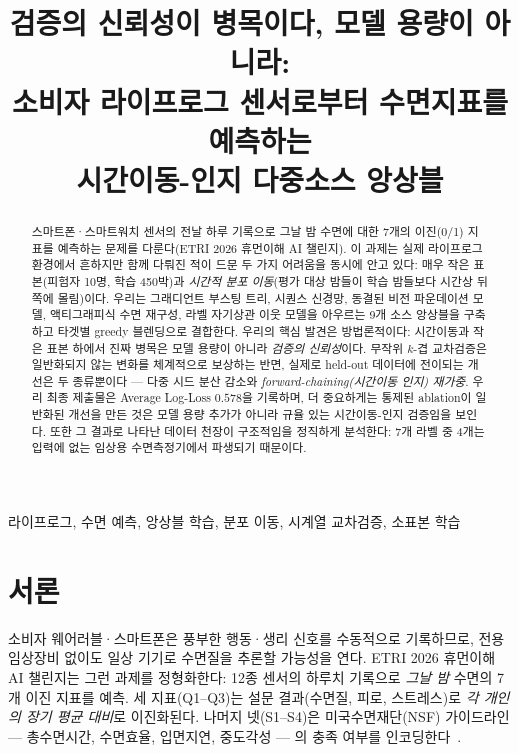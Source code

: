 \documentclass[conference]{IEEEtran}
\begin{document}
\title{검증의 신뢰성이 병목이다, 모델 용량이 아니라:\\
소비자 라이프로그 센서로부터 수면지표를 예측하는\\
시간이동-인지 다중소스 앙상블}

\author{
}

\maketitle

\begin{abstract}
스마트폰·스마트워치 센서의 전날 하루 기록으로 그날 밤 수면에 대한 7개의 이진(0/1) 지표를 예측하는
문제를 다룬다(ETRI 2026 휴먼이해 AI 챌린지). 이 과제는 실제 라이프로그 환경에서 흔하지만 함께 다뤄진
적이 드문 두 가지 어려움을 동시에 안고 있다: 매우 작은 표본(피험자 10명, 학습 450박)과 \emph{시간적
분포 이동}(평가 대상 밤들이 학습 밤들보다 시간상 뒤쪽에 몰림)이다. 우리는 그래디언트 부스팅 트리,
시퀀스 신경망, 동결된 비전 파운데이션 모델, 액티그래피식 수면 재구성, 라벨 자기상관 이웃 모델을 아우르는
9개 소스 앙상블을 구축하고 타겟별 greedy 블렌딩으로 결합한다. 우리의 핵심 발견은 방법론적이다:
시간이동과 작은 표본 하에서 진짜 병목은 모델 용량이 아니라 \emph{검증의 신뢰성}이다. 무작위 $k$-겹
교차검증은 일반화되지 않는 변화를 체계적으로 보상하는 반면, 실제로 held-out 데이터에 전이되는 개선은
두 종류뿐이다 — 다중 시드 분산 감소와 \emph{forward-chaining(시간이동 인지) 재가중}. 우리 최종 제출물은
Average Log-Loss $0.578$을 기록하며, 더 중요하게는 통제된 ablation이 일반화된 개선을 만든 것은 모델 용량
추가가 아니라 규율 있는 시간이동-인지 검증임을 보인다. 또한 그 결과로 나타난 데이터 천장이 구조적임을
정직하게 분석한다: 7개 라벨 중 4개는 입력에 없는 임상용 수면측정기에서 파생되기 때문이다.
\end{abstract}

\begin{IEEEkeywords}
라이프로그, 수면 예측, 앙상블 학습, 분포 이동, 시계열 교차검증, 소표본 학습
\end{IEEEkeywords}

\section{서론}
소비자 웨어러블·스마트폰은 풍부한 행동·생리 신호를 수동적으로 기록하므로, 전용 임상장비 없이도 일상
기기로 수면질을 추론할 가능성을 연다. ETRI 2026 휴먼이해 AI 챌린지는 그런 과제를 정형화한다: 12종
센서의 하루치 기록으로 \emph{그날 밤} 수면의 7개 이진 지표를 예측. 세 지표(Q1--Q3)는 설문 결과(수면질,
피로, 스트레스)로 \emph{각 개인의 장기 평균 대비}로 이진화된다. 나머지 넷(S1--S4)은 미국수면재단(NSF)
가이드라인 — 총수면시간, 수면효율, 입면지연, 중도각성 — 의 충족 여부를 인코딩한다~\cite{nsf}.
\end{document}
